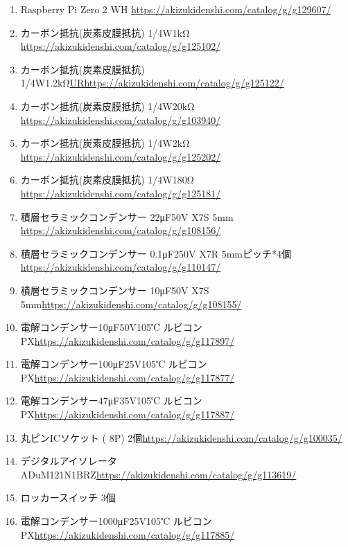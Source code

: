 \documentclass[a4paper,10pt]{jarticle}
\begin{document}
\begin{enumerate}
    \item Raspberry Pi Zero 2 WH \url{https://akizukidenshi.com/catalog/g/g129607/}
    \item カーボン抵抗(炭素皮膜抵抗) 1/4W1kΩ \url{https://akizukidenshi.com/catalog/g/g125102/}
    \item カーボン抵抗(炭素皮膜抵抗) 1/4W1.2kΩ\url{URhttps://akizukidenshi.com/catalog/g/g125122/}
    \item カーボン抵抗(炭素皮膜抵抗) 1/4W20kΩ \url{https://akizukidenshi.com/catalog/g/g103940/}
    \item カーボン抵抗(炭素皮膜抵抗) 1/4W2kΩ \url{https://akizukidenshi.com/catalog/g/g125202/}
    \item カーボン抵抗(炭素皮膜抵抗) 1/4W180Ω \url{https://akizukidenshi.com/catalog/g/g125181/}
    \item 積層セラミックコンデンサー 22μF50V X7S 5mm \url{https://akizukidenshi.com/catalog/g/g108156/}
    \item 積層セラミックコンデンサー 0.1μF250V X7R 5mmピッチ*4個\url{https://akizukidenshi.com/catalog/g/g110147/}
    \item 積層セラミックコンデンサー 10μF50V X7S 5mm\url{https://akizukidenshi.com/catalog/g/g108155/}
    \item 電解コンデンサー10μF50V105℃ ルビコンPX\url{https://akizukidenshi.com/catalog/g/g117897/}
    \item 電解コンデンサー100μF25V105℃ ルビコンPX\url{https://akizukidenshi.com/catalog/g/g117877/}
    \item 電解コンデンサー47μF35V105℃ ルビコンPX\url{https://akizukidenshi.com/catalog/g/g117887/}
    \item 丸ピンICソケット ( 8P) 2個\url{https://akizukidenshi.com/catalog/g/g100035/}
    \item デジタルアイソレータADuM121N1BRZ\url{https://akizukidenshi.com/catalog/g/g113619/}
\item ロッカースイッチ 3個
\item 電解コンデンサー1000μF25V105℃ ルビコンPX\url{https://akizukidenshi.com/catalog/g/g117885/}
\end{enumerate}
\end{document}
